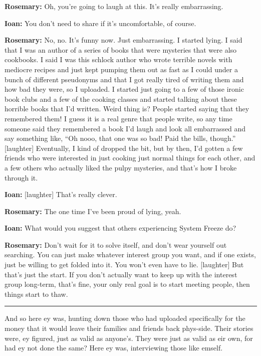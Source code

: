 \textbf{Rosemary:} Oh, you're going to laugh at this. It's really embarrassing.

\textbf{Ioan:} You don't need to share if it's uncomfortable, of course.

\textbf{Rosemary:} No, no. It's funny now. Just embarrassing. I started lying. I said that I was an author of a series of books that were mysteries that were also cookbooks. I said I was this schlock author who wrote terrible novels with mediocre recipes and just kept pumping them out as fast as I could under a bunch of different pseudonyms and that I got really tired of writing them and how bad they were, so I uploaded. I started just going to a few of those ironic book clubs and a few of the cooking classes and started talking about these horrible books that I'd written. Weird thing is? People started saying that they remembered them! I guess it is a real genre that people write, so any time someone said they remembered a book I'd laugh and look all embarrassed and say something like, ``Oh nooo, that one was so bad! Paid the bills, though.'' {[}laughter{]} Eventually, I kind of dropped the bit, but by then, I'd gotten a few friends who were interested in just cooking just normal things for each other, and a few others who actually liked the pulpy mysteries, and that's how I broke through it.

\textbf{Ioan:} {[}laughter{]} That's really clever.

\textbf{Rosemary:} The one time I've been proud of lying, yeah.

\textbf{Ioan:} What would you suggest that others experiencing System Freeze do?

\textbf{Rosemary:} Don't wait for it to solve itself, and don't wear yourself out searching. You can just make whatever interest group you want, and if one exists, just be willing to get folded into it. You won't even have to lie. {[}laughter{]} But that's just the start. If you don't actually want to keep up with the interest group long-term, that's fine, your only real goal is to start meeting people, then things start to thaw.

\begin{center}\rule{0.5\linewidth}{0.5pt}\end{center}

And so here ey was, hunting down those who had uploaded specifically for the money that it would leave their families and friends back phys-side. Their stories were, ey figured, just as valid as anyone's. They were just as valid as eir own, for had ey not done the same? Here ey was, interviewing those like emself.

